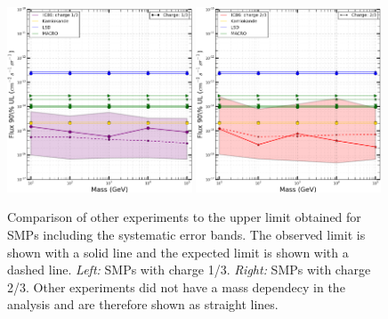 \begin{figure}
\centering
\includegraphics[width=0.49\textwidth]{chapter8/img/UpperLimitPlot_masses_withunc_0p333333333333}
\includegraphics[width=0.49\textwidth]{chapter8/img/UpperLimitPlot_masses_withunc_0p666666666667}
\caption{Comparison of other experiments to the upper limit obtained for SMPs including the systematic error bands. The observed limit is shown with a solid line and the expected limit is shown with a dashed line. \textit{Left: }SMPs with charge 1/3. \textit{Right: }SMPs with charge 2/3. Other experiments did not have a mass dependecy in the analysis and are therefore shown as straight lines.}
\label{fig:moneyplot2}
\end{figure}


